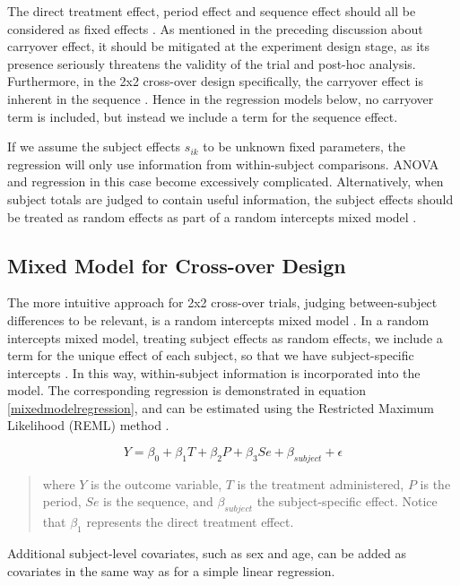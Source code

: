 \documentclass[12pt, TexShade, letterpaper]{report}
\begin{document}
The direct treatment effect, period effect and sequence effect should all be considered as fixed effects \cite{lim2021considerations}. As mentioned in the preceding discussion about carryover effect, it should be mitigated at the experiment design stage, as its presence seriously threatens the validity of the trial and post-hoc analysis. Furthermore, in the 2x2 cross-over design specifically, the carryover effect is inherent in the sequence \cite{lim2021considerations}. Hence in the regression models below, no carryover term is included, but instead we include a term for the sequence effect.

If we assume the subject effects $s_{ik}$ to be unknown fixed parameters, the regression will only use information from within-subject comparisons. ANOVA and regression in this case become excessively complicated. Alternatively, when subject totals are judged to contain useful information, the subject effects should be treated as random effects as part of a random intercepts mixed model \cite{jones2003design}.

\subsection{Mixed Model for Cross-over Design}\label{mixed-model-subsection}
The more intuitive approach for 2x2 cross-over trials, judging between-subject differences to be relevant, is a random intercepts mixed model \cite{jones2003design}. In a random intercepts mixed model, treating subject effects as random effects, we include a term for the unique effect of each subject, so that we have subject-specific intercepts \cite{mixedmodelsR}. In this way, within-subject information is incorporated into the model. The corresponding regression is demonstrated in equation \ref{mixedmodelregression}, and can be estimated using the Restricted Maximum Likelihood (REML) method \cite{jones2003design}.

\begin{equation}
   Y = \beta_0 + \beta_1 T + \beta_2 P + \beta_3 Se + \beta_{subject} + \epsilon
   \label{mixedmodelregression}
\end{equation}
\begin{quote}
    where $Y$ is the outcome variable, $T$ is the treatment administered, $P$ is the period, $Se$ is the sequence, and $\beta_{subject}$ the subject-specific effect. Notice that $\beta_1$ represents the direct treatment effect.
\end{quote}

Additional subject-level covariates, such as sex and age, can be added as covariates in the same way as for a simple linear regression.
\end{document}
